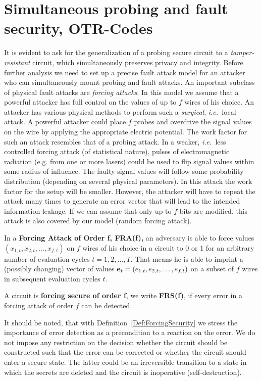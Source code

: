 \documentclass[11pt]{llncs}
\newcommand{\BDEF}{\begin{definition}}  \newcommand{\EDEF}{\end{definition}}
\newcommand{\ie}{{\it i.e.\ }}
\begin{document}
\section{Simultaneous probing and fault security, OTR-Codes}\label{Sec:OTR}
It is evident to ask for the generalization
of a probing secure circuit to a \emph{tamper-resistant} circuit, which
simultaneously preserves privacy and integrity.
Before further analysis we need to set up a precise fault attack model
for an attacker who can simultaneously mount probing and fault attacks.
An important subclass of physical fault attacks are \emph{forcing attacks}.
In this model we assume that a powerful attacker has full control
on the values of up to $f$ wires of his choice.
An attacker has various physical methods to perform
such a \emph{surgical}, \ie local attack.
A powerful attacker could place $f$ probes and overdrive the signal
values on the wire by applying the appropriate electric potential.
The work factor for such an attack resembles that of a probing attack.
In a weaker, \ie less controlled forcing attack (of statistical nature),
pulses of electromagnetic radiation (e.g. from one or more lasers)
could be used to flip signal values within some radius of influence.
The faulty signal
values will follow some probability distribution
(depending on several physical parameters).
In this attack the work factor for the setup will be smaller.
However, the attacker will have to repeat the attack many
times to generate an error vector that will lead to the intended
information leakage.
If we can assume that only up to $f$ bits are modified,
this attack is also covered by our model (random forcing attack).
\BDEF
In a \textbf{Forcing Attack of Order f, FRA(f),} an adversary
is able to force values $(x_{1,t}, x_{2,t}, \dots, x_{f,t})$
on $f$ wires of his choice in a circuit to 0 or 1
for an arbitrary number of
evaluation cycles $t = 1, 2, \dots, T$.
That means he is able to imprint a (possibly changing)
vector of values $\mathbf{e}_t=(e_{1,t}, e_{2,t}, \dots, e_{f,t})$
on a subset of $f$ wires in subsequent evaluation cycles $t$.
\EDEF
\BDEF
A circuit is \textbf{forcing secure of order f}, we write \textbf{FRS(f)},
if every error in a forcing attack of order $f$ can be detected.
\label{Def:ForcingSecurity}
\EDEF
It should be noted, that with  Definition~\ref{Def:ForcingSecurity}
we stress the importance of error
detection as a precondition to a reaction on the error.
We do not impose any restriction on the decision
whether the circuit should be constructed such that
the error can be corrected or whether the circuit should enter
a secure state. The latter could be an irreversible transition to a state in
which the secrets are deleted and the circuit is inoperative (self-destruction).
\end{document}
